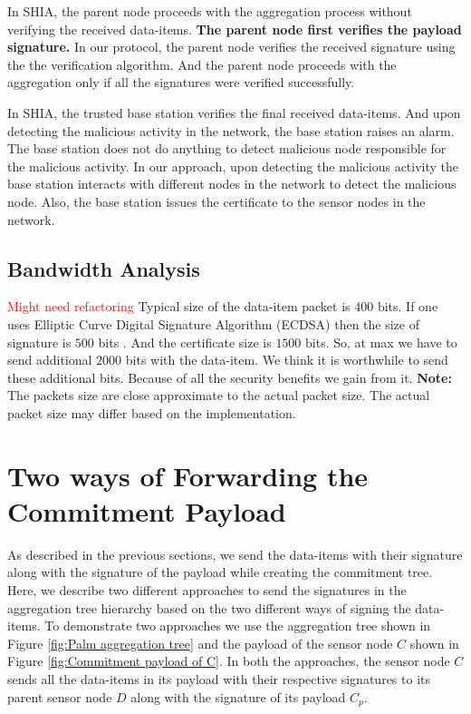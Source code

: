 	In SHIA, the parent node proceeds with the aggregation process without verifying the received data-items.
	\textbf{The parent node first verifies the payload signature.}
	In our protocol, the parent node verifies the received signature using the the verification algorithm.
	And the parent node proceeds with the aggregation only if all the signatures were verified successfully.

	In SHIA, the trusted base station verifies the final received data-items.
	And upon detecting the malicious activity in the network, the base station raises an alarm. 
	The base station does not do anything to detect malicious node responsible for the malicious activity.
	In our approach, upon detecting the malicious activity the base station interacts with different nodes in the network to detect the malicious node.
	Also, the  base station issues the certificate to the sensor nodes in the network.
	
	\subsection{Bandwidth Analysis}
	
		\textcolor{red}{Might need refactoring}
		Typical size of the data-item packet is $400$ bits.
		If one uses Elliptic Curve Digital Signature Algorithm (ECDSA) then the size of signature is $500$ bits \cite{ecdsa2009186}.
		And the certificate size is $1500$ bits.
		So, at max we have to send additional $2000$ bits with the data-item.
		We think it is worthwhile to send these additional bits.
		Because of all the security benefits we gain from it. 
		\textbf{Note:} The packets size are close approximate to the actual packet size. 
		The actual packet size may differ based on the implementation.

\section{Two ways of Forwarding the Commitment Payload}	
	
	As described in the previous sections, we send the data-items with their signature along with the signature of the payload while creating the commitment tree.
	Here, we describe two different approaches to send the signatures in the aggregation tree hierarchy based on the two different ways of signing the data-items.
	To demonstrate two approaches we use the aggregation tree shown in Figure \ref{fig:Palm aggregation tree} and the payload of the sensor node $C$ shown in Figure \ref{fig:Commitment payload of C}.
	In both the approaches, the sensor node $C$ sends all the data-items in its payload with their respective signatures to its parent sensor node $D$ along with the signature of its payload $C_{p}$.

